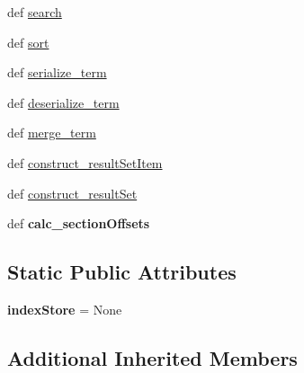 \begin{DoxyCompactItemize}
\item 
def \hyperlink{classcheshire3_1_1base_objects_1_1_index_a577288674fd8fac55930d8c1fa4bba5e}{search}
\item 
def \hyperlink{classcheshire3_1_1base_objects_1_1_index_a7f59af3e31392de775b001d6fe21d91a}{sort}
\item 
def \hyperlink{classcheshire3_1_1base_objects_1_1_index_a0abc04f5a1fb6bf6ffedddd153da210f}{serialize\-\_\-term}
\item 
def \hyperlink{classcheshire3_1_1base_objects_1_1_index_a4e4f41d0b37617e7c195db8eff558bc0}{deserialize\-\_\-term}
\item 
def \hyperlink{classcheshire3_1_1base_objects_1_1_index_abf055f08c47b5d14b5b7d6d1c381271f}{merge\-\_\-term}
\item 
def \hyperlink{classcheshire3_1_1base_objects_1_1_index_a53742c75fc48f14d82d719cea77b881b}{construct\-\_\-result\-Set\-Item}
\item 
def \hyperlink{classcheshire3_1_1base_objects_1_1_index_a17d16058536d6ee4f15081243702dbc3}{construct\-\_\-result\-Set}
\item 
\hypertarget{classcheshire3_1_1base_objects_1_1_index_a8faa7a0807ea9435c857d64e2bf620ee}{def {\bfseries calc\-\_\-section\-Offsets}}\label{classcheshire3_1_1base_objects_1_1_index_a8faa7a0807ea9435c857d64e2bf620ee}

\end{DoxyCompactItemize}
\subsection*{Static Public Attributes}
\begin{DoxyCompactItemize}
\item 
\hypertarget{classcheshire3_1_1base_objects_1_1_index_a0aaef90ce22b1fa76e85d5ed972597de}{{\bfseries index\-Store} = None}\label{classcheshire3_1_1base_objects_1_1_index_a0aaef90ce22b1fa76e85d5ed972597de}

\end{DoxyCompactItemize}
\subsection*{Additional Inherited Members}


